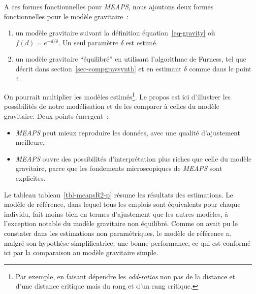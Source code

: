 \documentclass[
  10pt,
  a4paper,
  numbers=noendperiod,
  DIV=9]{scrreprt}
\providecommand{\tightlist}{%
  \setlength{\itemsep}{0pt}\setlength{\parskip}{0pt}}\usepackage{longtable,booktabs,array}
\begin{document}
A ces formes fonctionnelles pour \emph{MEAPS}, nous ajoutons deux formes
fonctionnelles pour le modèle gravitaire~:

\begin{enumerate}
\def\labelenumi{\arabic{enumi}.}
\setcounter{enumi}{3}
\tightlist
\item
  un modèle gravitaire suivant la définition équation~\ref{eq-gravity}
  où \(f(d)= e^{-d/\delta}\). Un seul paramètre \(\delta\) est estimé.
\item
  un modèle gravitaire ``équilibré'' en utilisant l'algorithme de
  Furness, tel que décrit dans section~\ref{sec-compgravsynth} et en
  estimant \(\delta\) comme dans le point 4.
\end{enumerate}

On pourrait multiplier les modèles estimés\footnote{Par exemple, en
  faisant dépendre les \emph{odd-ratios} non pas de la distance et d'une
  distance critique mais du rang et d'un rang critique.}. Le propos est
ici d'illustrer les possibilités de notre modélisation et de les
comparer à celles du modèle gravitaire. Deux points émergent~:

\begin{itemize}
\item
  \emph{MEAPS} peut mieux reproduire les données, avec une qualité
  d'ajustement meilleure,
\item
  \emph{MEAPS} ouvre des possibilités d'interprétation plus riches que
  celle du modèle gravitaire, parce que les fondements microscopiques de
  \emph{MEAPS} sont explicites.
\end{itemize}

Le tableau tableau~\ref{tbl-meapsR2-p} résume les résultats des
estimations. Le modèle de référence, dans lequel tous les emplois sont
équivalents pour chaque individu, fait moins bien en termes d'ajustement
que les autres modèles, à l'exception notable du modèle gravitaire non
équilibré. Comme on avait pu le constater dans les estimations non
paramétriques, le modèle de référence a, malgré son hypothèse
simplificatrice, une bonne performance, ce qui est conformé ici par la
comparaison au modèle gravitaire simple.
\end{document}

